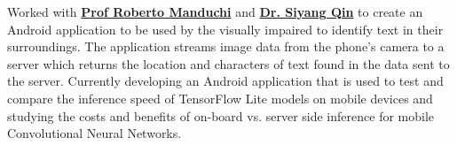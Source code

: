 \documentclass[letterpaper]{deedy-resume} %
\begin{document}
\begin{minipage}[t]{0.66\textwidth}

Worked with \textbf{\href{https://www.soe.ucsc.edu/people/manduchi}{Prof Roberto Manduchi}} and \textbf{\href{https://www.linkedin.com/in/siyang-qin-12b98467/}{Dr. Siyang Qin}} to create an Android application to be used by the visually impaired to identify text in their surroundings. The application streams image data from the phone's camera to a server which returns the location and characters of text found in the data sent to the server. 
Currently developing an Android application that is used to test and compare the inference speed of TensorFlow Lite models on mobile devices and studying the costs and benefits of on-board vs. server side inference for mobile Convolutional Neural Networks.

\sectionspace %


\end{minipage} %


\newpage %
\end{document}
